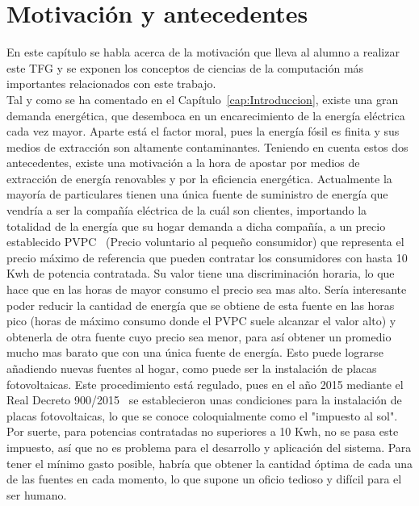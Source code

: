 \chapter{Motivación y antecedentes}
\label{cap:Antecedentes}
En este capítulo se habla acerca de la motivación que lleva al alumno a realizar este \gls{TFG} y se exponen los conceptos de ciencias de la computación más importantes relacionados con este trabajo.\\

Tal y como se ha comentado en el Capítulo~\ref{cap:Introduccion}, existe una gran demanda energética,  que desemboca en un encarecimiento de la energía eléctrica cada vez mayor. Aparte está el factor moral, pues la energía fósil es finita y sus medios de extracción son altamente contaminantes. Teniendo en cuenta estos dos antecedentes, existe una motivación a la hora de apostar por medios de extracción de energía renovables y por la eficiencia energética. Actualmente la mayoría de particulares tienen una única fuente de suministro de energía que vendría a ser la compañía eléctrica de la cuál son clientes, importando la totalidad de la energía que su hogar demanda a dicha compañía, a un precio establecido \gls{PVPC}~\cite{Ree14} (Precio voluntario al pequeño consumidor) que representa el precio máximo de referencia que pueden contratar los consumidores con hasta 10 Kwh de potencia contratada. Su valor tiene una discriminación horaria, lo que hace que en las horas de mayor consumo el precio sea mas alto. Sería interesante poder reducir la cantidad de energía que se obtiene de esta fuente en las horas pico (horas de máximo consumo donde el \gls{PVPC} suele alcanzar el valor alto) y obtenerla de otra fuente cuyo precio sea menor, para así obtener un promedio mucho mas barato que con una única fuente de energía. Esto puede lograrse añadiendo nuevas fuentes al hogar, como puede ser la instalación de placas fotovoltaicas. Este procedimiento está regulado, pues en el año 2015 mediante el Real Decreto 900/2015~\cite{Boe15} se establecieron unas condiciones para la instalación de placas fotovoltaicas, lo que se conoce coloquialmente como el "impuesto al sol". Por suerte, para potencias contratadas no superiores a 10 Kwh, no se pasa este impuesto, así que no es problema para el desarrollo y aplicación del sistema. Para tener el mínimo gasto posible, habría que obtener la cantidad óptima de cada una de las fuentes en cada momento, lo que supone un oficio tedioso y difícil para el ser humano.\\

